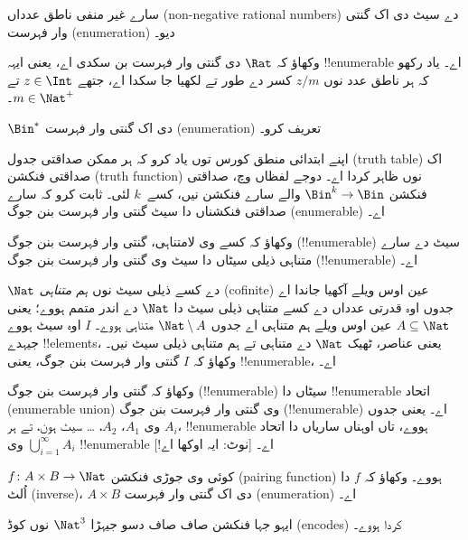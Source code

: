 \documentclass[../../../include/open-logic-section]{subfiles}
\begin{document}
\begin{prob}
سارے غیر منفی ناطق عدداں (non-negative rational numbers) دے سیٹ دی
اک گنتی وار فہرست (enumeration) دیو۔
\end{prob}

\begin{prob}
وکھاؤ کہ $\Rat$ دی گنتی وار فہرست بن سکدی اے، یعنی ایہہ
!!{enumerable} اے۔ یاد رکھو کہ ہر ناطق عدد نوں
$z/m$ کسر دے طور تے لکھیا جا سکدا اے، جتھے $z \in \Int$ تے
$m \in \Nat^+$۔
\end{prob}

\begin{prob}
$\Bin^*$ دی اک گنتی وار فہرست (enumeration) تعریف کرو۔
\end{prob}

\begin{prob}
اپنے ابتدائی منطق کورس توں یاد کرو کہ ہر ممکن صداقتی جدول (truth
table) اک صداقتی فنکشن (truth function) نوں ظاہر کردا اے۔ دوجے لفظاں
وچ، صداقتی فنکشن
$\Bin^k \to \Bin$ والے سارے فنکشن نیں، کسے~$k$ لئی۔ ثابت کرو کہ سارے صداقتی فنکشناں
دا سیٹ گنتی وار فہرست بنن جوگ (enumerable) اے۔
\end{prob}

\begin{prob}
وکھاؤ کہ کسے وی لامتناہی، گنتی وار فہرست بنن جوگ
(!!{enumerable}) سیٹ دے سارے متناہی ذیلی سیٹاں دا سیٹ وی گنتی وار
فہرست بنن جوگ (!!{enumerable}) اے۔
\end{prob}

\begin{prob}
$\Nat$ دے کسے ذیلی سیٹ نوں \emph{ہم متناہی} (cofinite) عین اوس ویلے
آکھیا جاندا اے جدوں اوہ قدرتی عدداں دے کسے متناہی ذیلی سیٹ دا $\Nat$
دے اندر متمم ہووے؛ یعنی $A \subseteq \Nat$ عین اوس ویلے ہم متناہی اے جدوں
$\Nat\setminus A$ متناہی ہووے۔
$I$ اوہ سیٹ ہووے جیہدے !!{element}s، یعنی عناصر، ٹھیک $\Nat$ دے
متناہی تے ہم متناہی ذیلی سیٹ نیں۔ وکھاؤ کہ $I$ گنتی وار فہرست بنن
جوگ، یعنی !!{enumerable}، اے۔
\end{prob}

\begin{prob}
وکھاؤ کہ گنتی وار فہرست بنن جوگ (!!{enumerable}) سیٹاں دا
!!{enumerable} اتحاد (enumerable union) وی گنتی وار فہرست بنن جوگ
(!!{enumerable}) اے۔ یعنی جدوں وی $A_1$، $A_2$، \dots{} سیٹ ہون، تے
ہر $A_i$، !!{enumerable} ہووے، تاں اوہناں ساریاں دا اتحاد
$\bigcup_{i=1}^\infty A_i$ وی !!{enumerable} اے۔ [نوٹ: ایہ اوکھا اے!]
\end{prob}

\begin{prob}
$f \colon A \times B \to \Nat$ کوئی وی جوڑی فنکشن (pairing function)
ہووے۔ وکھاؤ کہ $f$ دا اُلٹ (inverse)، $A \times B$ دی اک گنتی وار
فہرست (enumeration) اے۔
\end{prob}

\begin{prob}
ایہو جہا فنکشن صاف صاف دسو جیہڑا $\Nat^3$ نوں کوڈ (encodes) کردا ہووے۔
\end{prob}
\end{document}
